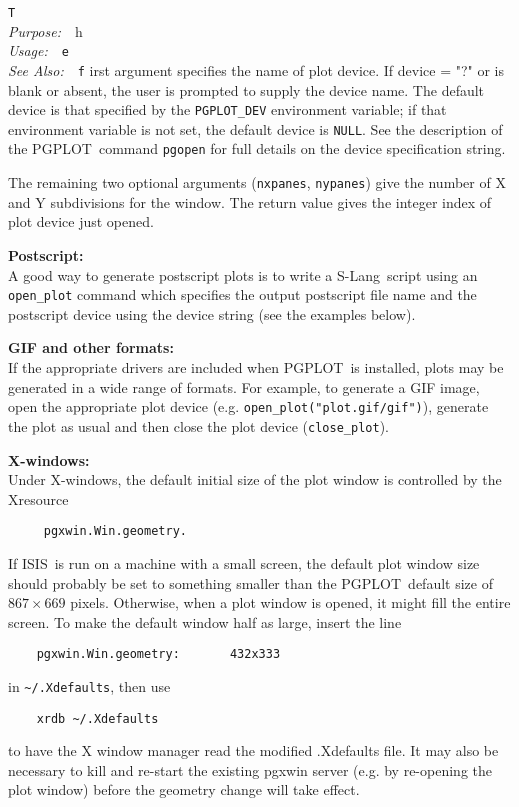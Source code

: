 \documentclass{book}
\makeatletter
\newif\ifpdf
\newcommand{\isisx}{{\sc ISIS~}}
\newcommand{\pgplot}{{\sc PGPLOT}}
\newcommand{\slang}{{\sc S-Lang}}
\newenvironment{isisfunction}[4]%
{\index{{#1}@{\tt #1}}%
  \ifpdf
  \else
     \addcontentsline{toc}{subsection}{{#1} -- {#2}}
  \fi
  \vbox{
          \vspace*{\baselineskip}
          {\LARGE\tt #1}\vspace*{\baselineskip}\\
          {{\it Purpose:}~~{#2}}\\
          {{\it Usage:}~~{\tt #3}}\\
          {{\it See Also:}~~{\tt #4}}
       }
}%
{ }
\makeatother
\begin{document}
{\begin{isisfunction}
The first argument specifies the name of plot device.  If
device = "?" or is blank or absent, the user is prompted to
supply the device name.  The default device is that specified
by the \verb|PGPLOT_DEV| environment variable; if that
environment variable is not set, the default device is
\verb|NULL|.  See the description of the \pgplot\ command
\verb|pgopen| for full details on the device specification
string.

The remaining two optional arguments (\verb|nxpanes|,
\verb|nypanes|) give the number of X and Y subdivisions for the
window. The return value gives the integer index of plot device
just opened.

\vspace*{\baselineskip}
{\bf Postscript:~~}\\ A good way to generate postscript plots is to write a
\slang{}ript using an {\tt open\_plot} command which specifies the output
postscript file name and the postscript device using the device string (see
the examples below).

\vspace*{\baselineskip}
{\bf GIF and other formats:~~}\\ If the appropriate drivers are included
when \pgplot\ is installed, plots may be generated in a wide range of
formats.  For example, to generate a GIF image, open the appropriate plot
device (e.g. {\tt open\_plot("plot.gif/gif")}), generate the plot as usual
and then close the plot device ({\tt close\_plot}).

\vspace*{\baselineskip}
{\bf X-windows:~~}\\
Under X-windows, the default initial size of the plot
window is controlled by the Xresource
\begin{verbatim}
     pgxwin.Win.geometry.
\end{verbatim}
If \isisx is run on a machine with a small screen, the default
plot window size should probably be set to something smaller than the
\pgplot\ default size of $867\times 669$ pixels.  Otherwise, when a plot
window is opened, it might fill the entire screen. To make the default
window half as large, insert the line
\begin{verbatim}
    pgxwin.Win.geometry:       432x333
\end{verbatim}
in \verb|~/.Xdefaults|, then use
\begin{verbatim}
    xrdb ~/.Xdefaults
\end{verbatim}
to have the X window manager read the modified .Xdefaults file. It may also
be necessary to kill and re-start the existing pgxwin server (e.g. by
re-opening the plot window) before the geometry change will take effect.


\end{isisfunction}}
\end{document}
